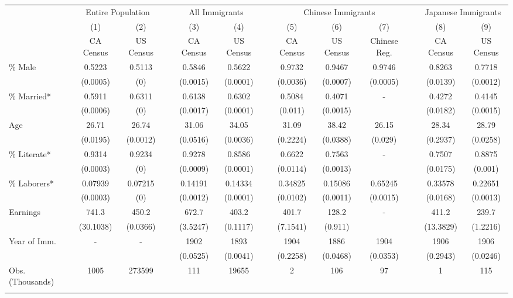 \begin{tabular}{lcccccccccccc}
\hhline{=============}
& \multicolumn{2}{c}{Entire Population} & & \multicolumn{2}{c}{All Immigrants} & & \multicolumn{3}{c}{Chinese Immigrants} & & \multicolumn{2}{c}{Japanese Immigrants} \\ 
\hhline{~--~--~---~--}
& (1) & (2) & & (3) & (4) & & (5) & (6) & (7) & & (8) & (9) \\ 
& CA Census & US Census & & CA Census & US Census & & CA Census & US Census & Chinese Reg. & & CA Census & US Census \\ 
 \hhline{-------------}
\% Male & 0.5223&0.5113&&0.5846&0.5622&&0.9732&0.9467&0.9746&&0.8263&0.7718 \\ 
& (0.0005)&(0)&&(0.0015)&(0.0001)&&(0.0036)&(0.0007)&(0.0005)&&(0.0139)&(0.0012) \\ 
\% Married* & 0.5911&0.6311&&0.6138&0.6302&&0.5084&0.4071&-&&0.4272&0.4145 \\ 
& (0.0006)&(0)&&(0.0017)&(0.0001)&&(0.011)&(0.0015)&&&(0.0182)&(0.0015) \\ 
Age & 26.71&26.74&&31.06&34.05&&31.09&38.42&26.15&&28.34&28.79 \\ 
& (0.0195)&(0.0012)&&(0.0516)&(0.0036)&&(0.2224)&(0.0388)&(0.029)&&(0.2937)&(0.0258) \\ 
\% Literate* & 0.9314&0.9234&&0.9278&0.8586&&0.6622&0.7563&-&&0.7507&0.8875 \\ 
& (0.0003)&(0)&&(0.0009)&(0.0001)&&(0.0114)&(0.0013)&&&(0.0175)&(0.001) \\ 
\% Laborers* & 0.07939&0.07215&&0.14191&0.14334&&0.34825&0.15086&0.65245&&0.33578&0.22651 \\ 
& (0.0003)&(0)&&(0.0012)&(0.0001)&&(0.0102)&(0.0011)&(0.0015)&&(0.0168)&(0.0013) \\ 
Earnings & 741.3&450.2&&672.7&403.2&&401.7&128.2&-&&411.2&239.7 \\ 
& (30.1038)&(0.0366)&&(3.5247)&(0.1117)&&(7.1541)&(0.911)&&&(13.3829)&(1.2216) \\ 
Year of Imm. & -&-&&1902&1893&&1904&1886&1904&&1906&1906 \\ 
& &&&(0.0525)&(0.0041)&&(0.2258)&(0.0468)&(0.0353)&&(0.2943)&(0.0246) \\ 
Obs. (Thousands)
&
1005&273599&&111&19655&&2&106&97&&1&115
\\ 
\hhline{-------------}
\end{tabular}

